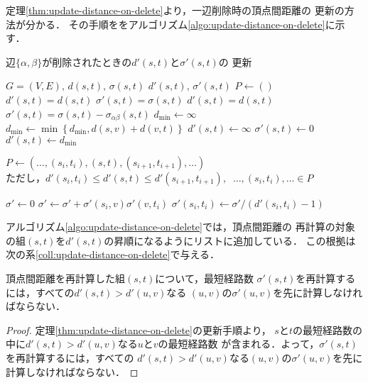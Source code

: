 定理\ref{thm:update-distance-on-delete}より，一辺削除時の頂点間距離の
更新の方法が分かる．
その手順ををアルゴリズム\ref{algo:update-distance-on-delete}に示す．
\begin{algorithm}[H]
  \caption{辺$\{\alpha,\beta\}$が削除されたときの$d'(s,t)$と$\sigma'(s,t)$の
    更新}\label{algo:update-distance-on-delete}
  \begin{algorithmic}[1]
    \Require $G=(V,E),\,d(s,t),\,\sigma(s,t)$
    \Ensure $d'(s,t),\,\sigma'(s,t)$
    \State $P\gets()$
    \State $d'(s,t)=d(s,t)$
    \State $\sigma'(s,t)=\sigma(s,t)$
    \State $d'(s,t)=d(s,t)$
    \State $\sigma'(s,t)=\sigma(s,t)-\sigma_{\alpha\beta}(s,t)$
    \State $d_{\min}\gets \infty$
    \State $d_{\min}\gets\min\left\{d_{\min},d(s,v)+d(v,t)\right\}$
    \EndFor
    \State $d'(s,t)\gets\infty$
    \State $\sigma'(s,t)\gets0$
    \Else
    \State $d'(s,t)\gets d_{\min}$
    \State \parbox[t]{\linewidth}{
      $P\gets(\ldots,(s_i,t_i),(s,t),(s_{i+1},t_{i+1}),\ldots)$ \\
      ただし，$d'(s_i,t_i)\leq d'(s,t)\leq d'(s_{i+1},t_{i+1}),\:$
      $\ldots,(s_i,t_i),\ldots\in P$
    }
    \EndIf
    \EndIf
    \EndFor
    \State $\sigma'\gets0$
    \State $\sigma'\gets\sigma'+\sigma'(s_i,v)\sigma'(v,t_i)$
    \EndFor
    \State $\sigma'(s_i,t_i)\gets\sigma'/(d'(s_i,t_i)-1)$
    \EndFor
  \end{algorithmic}
\end{algorithm}

アルゴリズム\ref{algo:update-distance-on-delete}では，頂点間距離の
再計算の対象の組$(s,t)$を$d'(s,t)$の昇順になるようにリストに追加している．
この根拠は次の系\ref{coll:update-distance-on-delete}で与える．
\begin{corollary}
  \label{coll:update-distance-on-delete}
  頂点間距離を再計算した組$(s,t)$について，最短経路数
  $\sigma'(s,t)$を再計算するには，すべての$d'(s,t)>d'(u,v)$なる
  $(u,v)$の$\sigma'(u,v)$を先に計算しなければならない．
\end{corollary}
\begin{proof}
  定理\ref{thm:update-distance-on-delete}の更新手順より，
  $s$と$t$の最短経路数の中に$d'(s,t)>d'(u,v)$なる$u$と$v$の最短経路数
  が含まれる．よって，$\sigma'(s,t)$を再計算するには，すべての
  $d'(s,t)>d'(u,v)$なる$(u,v)$の$\sigma'(u,v)$を先に計算しなければならない．
\end{proof}

